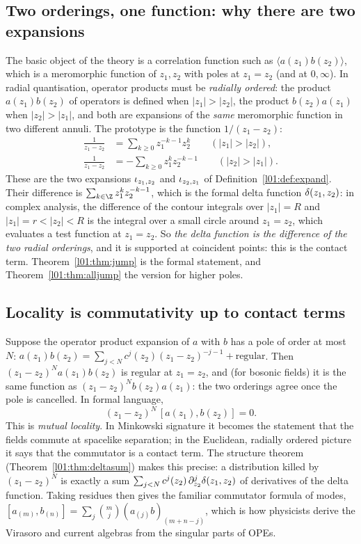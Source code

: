 \subsection{Two orderings, one function: why there are two expansions}

The basic object of the theory is a correlation function such as
$\langle a(z_1)b(z_2)\rangle$, which is a meromorphic function of $z_1,z_2$ with poles at
$z_1 = z_2$ (and at $0,\infty$). In radial quantisation, operator products must be
\emph{radially ordered}: the product $a(z_1)b(z_2)$ of operators is defined when $|z_1|>|z_2|$,
the product $b(z_2)a(z_1)$ when $|z_2|>|z_1|$, and both are expansions of the \emph{same}
meromorphic function in two different annuli. The prototype is the function $1/(z_1-z_2)$:
\begin{align*}
  \frac{1}{z_1-z_2} &= \sum_{k\ge0} z_1^{-k-1}z_2^{k}\qquad (|z_1|>|z_2|),\\
  \frac{1}{z_1-z_2} &= -\sum_{k\ge0} z_1^{k}z_2^{-k-1}\qquad (|z_2|>|z_1|).
\end{align*}
These are the two expansions $\iota_{z_1,z_2}$ and $\iota_{z_2,z_1}$ of
Definition~\ref{l01:def:expand}. Their difference is
$\sum_{k\in\Z}z_1^{k}z_2^{-k-1}$, which is the formal delta function $\delta(z_1,z_2)$: in complex
analysis, the difference of the contour integrals over $|z_1| = R$ and $|z_1| = r<|z_2|<R$ is the
integral over a small circle around $z_1 = z_2$, which evaluates a test function at $z_1 = z_2$.
So \emph{the delta function is the difference of the two radial orderings}, and it is supported
at coincident points: this is the contact term. Theorem~\ref{l01:thm:jump} is the formal
statement, and Theorem~\ref{l01:thm:alljump} the version for higher poles.

\subsection{Locality is commutativity up to contact terms}

Suppose the operator product expansion of $a$ with $b$ has a pole of order at most $N$:
$a(z_1)b(z_2) = \sum_{j<N}c^j(z_2)(z_1-z_2)^{-j-1} + \text{regular}$. Then
$(z_1-z_2)^{N}a(z_1)b(z_2)$ is regular at $z_1 = z_2$, and (for bosonic fields) it is the same
function as $(z_1-z_2)^{N}b(z_2)a(z_1)$: the two orderings agree once the pole is cancelled. In
formal language,
\begin{equation*}
  (z_1-z_2)^N\,[a(z_1),b(z_2)] = 0 .
\end{equation*}
This is \emph{mutual locality}. In Minkowski signature it becomes the statement that the fields
commute at spacelike separation; in the Euclidean, radially ordered picture it says that the
commutator is a contact term. The structure theorem (Theorem~\ref{l01:thm:deltasum}) makes this
precise: a distribution killed by $(z_1-z_2)^N$ is exactly a sum
$\sum_{j<N}c^j(z_2)\,\partial_{z_2}^j\delta(z_1,z_2)$ of derivatives of the delta function. Taking
residues then gives the familiar commutator formula of modes, $[a_{(m)},b_{(n)}] =
\sum_j\binom mj (a_{(j)}b)_{(m+n-j)}$, which is how physicists derive the Virasoro and current
algebras from the singular parts of OPEs.


